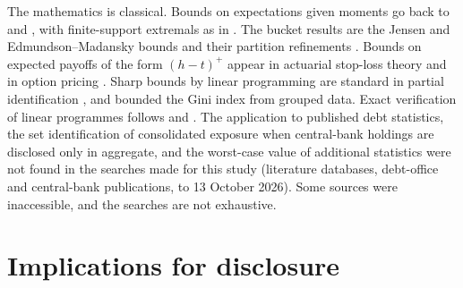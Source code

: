 \documentclass[11pt,a4paper]{article}
\theoremstyle{remark}
\begin{document}
The mathematics is classical. Bounds on expectations given moments go back to \citet{Rogosinski1958} and \citet{Kemperman1968}, with finite-support extremals as in \citet{Winkler1988}. The bucket results are the Jensen and Edmundson--Madansky bounds and their partition refinements \citep{Madansky1959,HuangZiembaBenTal1977,BirgeWets1986}. Bounds on expected payoffs of the form $(h-t)^+$ appear in actuarial stop-loss theory \citep{DeVylderGoovaerts1982,JansenHaezendonckGoovaerts1986} and in option pricing \citep{Lo1987,BertsimasPopescu2002,BertsimasPopescu2005}. Sharp bounds by linear programming are standard in partial identification \citep{ManskiTamer2002,MogstadSantosTorgovitsky2018}, and \citet{Gastwirth1972} bounded the Gini index from grouped data. Exact verification of linear programmes follows \citet{ApplegateEtAl2007} and \citet{GleixnerSteffyWolter2016}. The application to published debt statistics, the set identification of consolidated exposure when central-bank holdings are disclosed only in aggregate, and the worst-case value of additional statistics were not found in the searches made for this study (literature databases, debt-office and central-bank publications, to 13 October 2026). Some sources were inaccessible, and the searches are not exhaustive.

\section{Implications for disclosure}\label{sec:implications}
\end{document}
